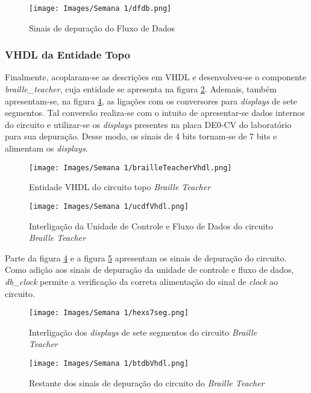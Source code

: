 \documentclass[amsmath,amssymb,floatfix]{report}
\begin{document}
\begin{figure}[H]
    \centering
    \texttt{[image: Images/Semana 1/dfdb.png]}
    \caption{Sinais de depuração do Fluxo de Dados}
    \label{fig:dfdb}
\end{figure}


\subsubsection{VHDL da Entidade Topo}
\label{subsubsec:btVhdl1}

Finalmente, acoplaram-se as descrições em VHDL e desenvolveu-se o componente \textit{braille\_teacher}, cuja entidade se apresenta na figura \ref{fig:brailleTeacherVhdl}. Ademais, também apresentam-se, na figura \ref{fig:hexs7seg}, as ligações com os conversores para \textit{displays} de sete segmentos. Tal conversão realiza-se com o intuito de apresentar-se dados internos do circuito e utilizar-se os \textit{displays} presentes na placa DE0-CV do laboratório para sua depuração. Desse modo, os sinais de 4 bits tornam-se de 7 bits e alimentam os \textit{displays}.

\begin{figure}[H]
    \centering
    \texttt{[image: Images/Semana 1/brailleTeacherVhdl.png]}
    \caption{Entidade VHDL do circuito topo \textit{Braille Teacher}}
    \label{fig:brailleTeacherVhdl}
\end{figure}

\begin{figure}[H]
    \centering
    \texttt{[image: Images/Semana 1/ucdfVhdl.png]}
    \caption{Interligação da Unidade de Controle e Fluxo de Dados do circuito \textit{Braille Teacher}}
    \label{fig:ucdfVhdl}
\end{figure}

Parte da figura \ref{fig:hexs7seg} e a figura \ref{fig:btdbVhdl} apresentam os sinais de depuração do circuito. Como adição aos sinais de depuração da unidade de controle e fluxo de dados, \textit{db\_clock} permite a verificação da correta alimentação do sinal de \textit{clock} ao circuito.

\begin{figure}[H]
    \centering
    \texttt{[image: Images/Semana 1/hexs7seg.png]}
    \caption{Interligação dos \textit{displays} de sete segmentos do circuito \textit{Braille Teacher}}
    \label{fig:hexs7seg}
\end{figure}

\begin{figure}[H]
    \centering
    \texttt{[image: Images/Semana 1/btdbVhdl.png]}
    \caption{Restante dos sinais de depuração do circuito do \textit{Braille Teacher}}
    \label{fig:btdbVhdl}
\end{figure}
\end{document}
